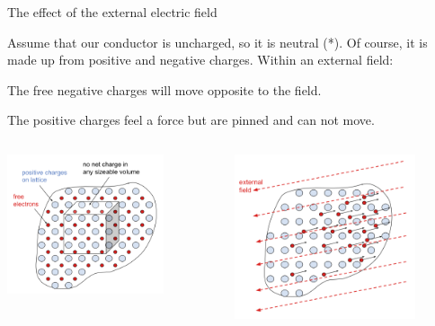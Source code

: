 \begin{frame}{The effect of the external electric field}

Assume that our conductor is uncharged, so it is neutral (*).
Of course, it is made up from positive and negative charges.
Within an external field:
\begin{itemize}
{\small
 \item The free negative charges will move opposite to the field.
 \item The positive charges feel a force but are pinned and can not move.
}
\end{itemize}

\begin{columns}
  \begin{column}{0.50\textwidth}
      \begin{center}
        \includegraphics[width=0.75\textwidth]{./images/schematics/metal_in_electric_field_1.png}\\
      \end{center}
  \end{column}
  \begin{column}{0.50\textwidth}
      \begin{center}
        \includegraphics[width=0.80\textwidth]{./images/schematics/metal_in_electric_field_2.png}\\
      \end{center}
  \end{column}
\end{columns}


\end{frame}
